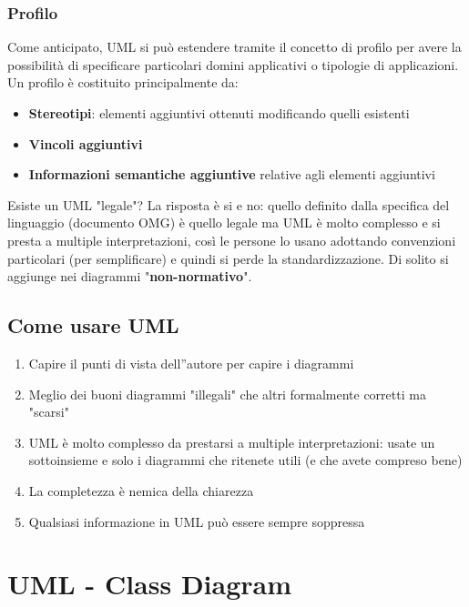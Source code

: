 \documentclass[12pt, a4paper]{report}
\begin{document}
\subsection{Profilo}
Come anticipato, UML si può estendere tramite il concetto di profilo per avere la possibilità di specificare particolari domini applicativi o tipologie di applicazioni.\\
Un profilo è costituito principalmente da:
\begin{itemize}
    \item \textbf{Stereotipi}: elementi aggiuntivi ottenuti modificando quelli esistenti
    \item \textbf{Vincoli aggiuntivi}
    \item \textbf{Informazioni semantiche aggiuntive} relative agli elementi aggiuntivi
\end{itemize}
Esiste un UML "legale"? La risposta è si e no: quello definito dalla specifica del  linguaggio (documento OMG) è quello legale ma UML è molto complesso e si presta a multiple interpretazioni, così le persone lo usano adottando convenzioni particolari (per semplificare) e quindi si perde la standardizzazione. Di solito si aggiunge nei diagrammi "\textbf{non-normativo}".
\section{Come usare UML}
\begin{enumerate}
    \item Capire il punti di vista dell''autore per capire i diagrammi
    \item Meglio dei buoni diagrammi "illegali" che altri formalmente corretti ma "scarsi"
    \item UML è molto complesso da prestarsi a multiple interpretazioni: usate un sottoinsieme e solo i diagrammi che ritenete utili (e che avete compreso bene)
    \item La completezza è nemica della chiarezza
    \item Qualsiasi informazione in UML può essere sempre soppressa
\end{enumerate}
\chapter{UML - Class Diagram}
\end{document}

